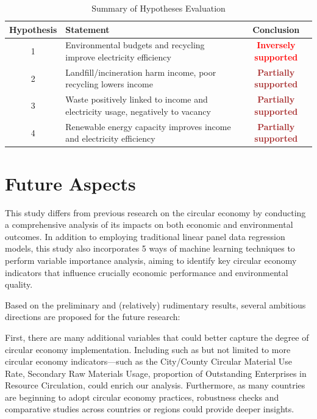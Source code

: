 \documentclass{article}
\begin{document}
\begin{table}[h!]
\centering
\caption{Summary of Hypotheses Evaluation}
\begin{tabular}{|c|p{7cm}|c|}
\hline
\textbf{Hypothesis} & \textbf{Statement} & \textbf{Conclusion} \\
\hline
1 & Environmental budgets and recycling improve electricity efficiency & \textcolor{red}{\textbf{Inversely supported}} \\
\hline
2 & Landfill/incineration harm income, poor recycling lowers income & \textcolor{brown}{\textbf{Partially supported}} \\
\hline
3 & Waste positively linked to income and electricity usage, negatively to vacancy & \textcolor{brown}{\textbf{Partially supported}} \\
\hline
4 & Renewable energy capacity improves income and electricity efficiency & \textcolor{brown}{\textbf{Partially supported}} \\
\hline
\end{tabular}
\end{table}

    
\section{Future Aspects}
This study differs from previous research on the circular economy by conducting a comprehensive analysis of its impacts on both economic and environmental outcomes. 
In addition to employing traditional linear panel data regression models, this study also incorporates 5 ways of machine learning techniques to perform variable importance analysis, aiming to identify key circular economy indicators that influence crucially economic performance and environmental quality.

Based on the preliminary and (relatively) rudimentary results, several ambitious directions are proposed for the future research:

First, there are many additional variables that could better capture the degree of circular economy implementation. 
Including such as but not limited to more circular economy indicators—such as the City/County Circular Material Use Rate, Secondary Raw Materials Usage, proportion of Outstanding Enterprises in Resource Circulation, could enrich our analysis. 
Furthermore, as many countries are beginning to adopt circular economy practices, robustness checks and comparative studies across countries or regions could provide deeper insights.
\end{document}

